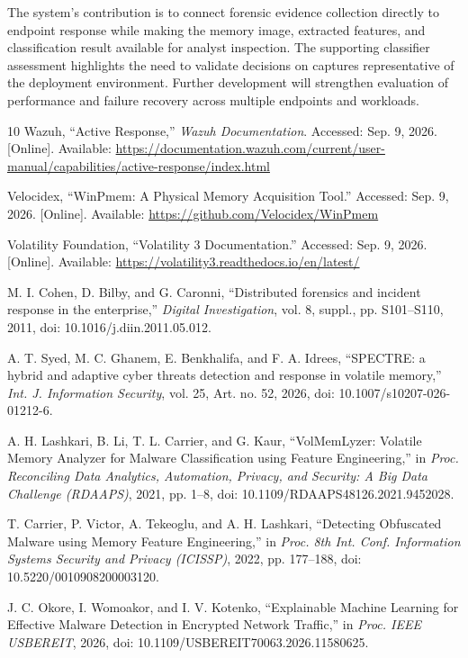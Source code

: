 \documentclass[conference]{IEEEtran}
\begin{document}
The system's contribution is to connect forensic evidence collection directly to endpoint response while making the memory image, extracted features, and classification result available for analyst inspection. The supporting
classifier assessment highlights the need to validate decisions on captures representative of the deployment environment. Further development will strengthen evaluation of performance and failure recovery across multiple endpoints and workloads.
\begin{thebibliography}{10}
 Wazuh, ``Active Response,'' \textit{Wazuh Documentation}.
Accessed: Sep. 9, 2026. [Online]. Available:
\url{https://documentation.wazuh.com/current/user-manual/capabilities/active-response/index.html}

 Velocidex, ``WinPmem: A Physical Memory Acquisition Tool.''
Accessed: Sep. 9, 2026. [Online]. Available:
\url{https://github.com/Velocidex/WinPmem}

 Volatility Foundation, ``Volatility 3 Documentation.''
Accessed: Sep. 9, 2026. [Online]. Available:
\url{https://volatility3.readthedocs.io/en/latest/}

 M. I. Cohen, D. Bilby, and G. Caronni,
``Distributed forensics and incident response in the enterprise,''
\textit{Digital Investigation}, vol. 8, suppl., pp. S101--S110, 2011,
doi: 10.1016/j.diin.2011.05.012.

 A. T. Syed, M. C. Ghanem, E. Benkhalifa, and
F. A. Idrees, ``SPECTRE: a hybrid and adaptive cyber threats detection and
response in volatile memory,'' \textit{Int. J. Information Security},
vol. 25, Art. no. 52, 2026, doi: 10.1007/s10207-026-01212-6.

 A. H. Lashkari, B. Li, T. L. Carrier, and G. Kaur,
``VolMemLyzer: Volatile Memory Analyzer for Malware Classification using
Feature Engineering,'' in \textit{Proc. Reconciling Data Analytics,
Automation, Privacy, and Security: A Big Data Challenge (RDAAPS)},
2021, pp. 1--8, doi: 10.1109/RDAAPS48126.2021.9452028.

 T. Carrier, P. Victor, A. Tekeoglu, and A. H. Lashkari,
``Detecting Obfuscated Malware using Memory Feature Engineering,'' in
\textit{Proc. 8th Int. Conf. Information Systems Security and Privacy
(ICISSP)}, 2022, pp. 177--188, doi: 10.5220/0010908200003120.

 J. C. Okore, I. Womoakor, and I. V. Kotenko,
``Explainable Machine Learning for Effective Malware Detection in Encrypted
Network Traffic,'' in \textit{Proc. IEEE USBEREIT}, 2026,
doi: 10.1109/USBEREIT70063.2026.11580625.


\end{thebibliography}
\end{document}

